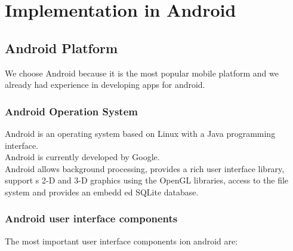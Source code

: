 
\chapter{Implementation in Android} \label{chapter:metaio}
\section{Android Platform}
We choose Android because it is the most popular mobile platform and we already had experience in developing apps for android. 

\subsection{Android Operation System}
Android is an operating system based on Linux with a Java programming interface.
\\


Android is currently developed by Google.
\\


Android allows background processing, provides a rich user interface library, support
s 2-D and 3-D
graphics using the OpenGL libraries, access to the file system and provides an embedd
ed SQLite
database.\cite{androidDevTut}

\subsection{Android user interface components}
The most important user interface components ion android are: 


